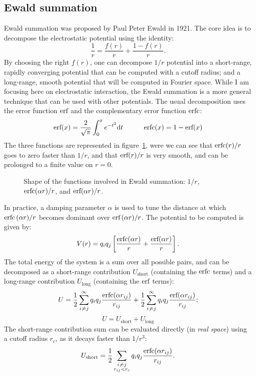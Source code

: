 \documentclass[thesis]{subfiles}
\begin{document}
\subsection{Ewald summation}

Ewald summation was proposed by Paul Peter Ewald in 1921\cite{Ewald1921}. The
core idea is to decompose the electrostatic potential using the identity:
\[ \frac{1}{r} = \frac{f(r)}{r} + \frac{1 - f(r)}{r}. \]
By choosing the right $f(r)$, one can decompose $1/r$ potential into a
short-range, rapidly converging potential that can be computed with a cutoff
radius; and a long-range, smooth potential that will be computed in Fourier
space. While I am focusing here on electrostatic interaction, the Ewald
summation is a more general technique that can be used with other potentials.
The usual decomposition uses the error function ${\normalfont\text{erf}}$ and the complementary
error function ${\normalfont\text{erfc}}$:
\[{\normalfont\text{erf}}(x) = \frac{2}{\sqrt\pi} \int_0^x e^{-t^2} \text{d} t \hskip3em {\normalfont\text{erfc}}(x) = 1 - {\normalfont\text{erf}}(x)\]
The three functions are represented in figure~\ref{fig:ewald:erf}, were we can
see that ${\normalfont\text{erfc}}(r)/r$ goes to zero faster than $1/r$, and that ${\normalfont\text{erf}}(r)/r$ is
very smooth, and can be prolonged to a finite value on $r = 0$.

\begin{figure}[ht]
    \centering
    
    \caption{Shape of the functions involved in Ewald summation: $1/r$, ${\normalfont\text{erfc}}(\alpha r) / r$,
    and ${\normalfont\text{erf}}(\alpha r) / r$.}
    \label{fig:ewald:erf}
\end{figure}

In practice, a damping parameter $\alpha$ is used to tune the distance at which
${\normalfont\text{erfc}}\,(\alpha r) / r$ becomes dominant over ${\normalfont\text{erf}}\,(\alpha r) / r$. The
potential to be computed is given by:
\[ V(r) = q_i q_j \left[\frac{{\normalfont\text{erfc}}(\alpha r)}{r} + \frac{{\normalfont\text{erf}}(\alpha r)}{r} \right].\]
The total energy of the system is a sum over all possible pairs, and can be
decomposed as a short-range contribution $U_\text{short}$ (containing the
${\normalfont\text{erfc}}$ terms) and a long-range contribution $U_\text{long}$ (containing the
${\normalfont\text{erf}}$ terms):
\[ U = \frac12 \sum_{i\not\kern0.2ex= j}^\infty q_i q_j \frac{{\normalfont\text{erfc}}(\alpha r_{ij})}{r_{ij}} + \frac12 \sum_{i\not\kern0.2ex= j}^\infty q_i q_j \frac{{\normalfont\text{erf}}(\alpha r_{ij})}{r_{ij}};\]
\[ U = U_\text{short} + U_\text{long}\]
The short-range contribution sum can be evaluated directly (in \emph{real
space}) using a cutoff radius $r_c$, as it decays faster than $1/r^3$:
\[ U_\text{short} = \frac12 \sum_{\substack{i\not\kern0.2ex= j \\ r_{ij} < r_c}} q_i q_j \frac{{\normalfont\text{erfc}}(\alpha r_{ij})}{r_{ij}}.\]
\end{document}
